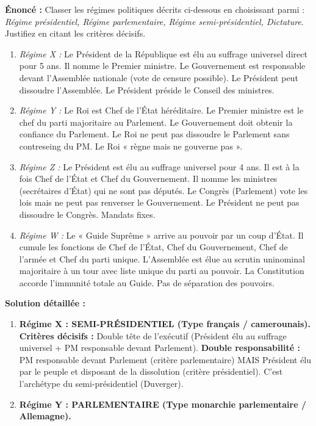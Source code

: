 \documentclass[11pt]{article}
\begin{document}
\begin{exoresolu}
\textbf{Énoncé :} Classer les régimes politiques décrits ci-dessous en choisissant parmi : \emph{Régime présidentiel, Régime parlementaire, Régime semi-présidentiel, Dictature}. Justifiez en citant les critères décisifs.
\begin{enumerate}
    \item \textit{Régime X :} Le Président de la République est élu au suffrage universel direct pour 5 ans. Il nomme le Premier ministre. Le Gouvernement est responsable devant l'Assemblée nationale (vote de censure possible). Le Président peut dissoudre l'Assemblée. Le Président préside le Conseil des ministres.
    \item \textit{Régime Y :} Le Roi est Chef de l'État héréditaire. Le Premier ministre est le chef du parti majoritaire au Parlement. Le Gouvernement doit obtenir la confiance du Parlement. Le Roi ne peut pas dissoudre le Parlement sans contreseing du PM. Le Roi « règne mais ne gouverne pas ».
    \item \textit{Régime Z :} Le Président est élu au suffrage universel pour 4 ans. Il est à la fois Chef de l'État et Chef du Gouvernement. Il nomme les ministres (secrétaires d'État) qui ne sont pas députés. Le Congrès (Parlement) vote les lois mais ne peut pas renverser le Gouvernement. Le Président ne peut pas dissoudre le Congrès. Mandats fixes.
    \item \textit{Régime W :} Le « Guide Suprême » arrive au pouvoir par un coup d'État. Il cumule les fonctions de Chef de l'État, Chef du Gouvernement, Chef de l'armée et Chef du parti unique. L'Assemblée est élue au scrutin uninominal majoritaire à un tour avec liste unique du parti au pouvoir. La Constitution accorde l'immunité totale au Guide. Pas de séparation des pouvoirs.
\end{enumerate}
\tcblower
\textbf{Solution détaillée :}
\begin{enumerate}
    \item \textbf{Régime X : SEMI-PRÉSIDENTIEL (Type français / camerounais).}
    \textbf{Critères décisifs :} Double tête de l'exécutif (Président élu au suffrage universel + PM responsable devant Parlement). \textbf{Double responsabilité :} PM responsable devant Parlement (critère parlementaire) MAIS Président élu par le peuple et disposant de la dissolution (critère présidentiel). C'est l'archétype du semi-présidentiel (Duverger).
    \item \textbf{Régime Y : PARLEMENTAIRE (Type monarchie parlementaire / Allemagne).}

\end{enumerate}
\end{exoresolu}
\end{document}
